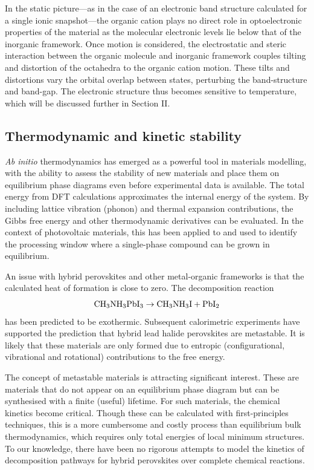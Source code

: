 In the static picture---as in the case of an electronic band structure calculated for a single ionic snapshot---the organic cation plays no direct role in optoelectronic properties of the material as the molecular electronic levels lie below that of the inorganic framework.
Once motion is considered, the electrostatic and steric interaction between the organic molecule and inorganic framework couples tilting and distortion of the octahedra to the organic cation motion.
These tilts and distortions vary the orbital overlap between states, perturbing the band-structure and band-gap.\autocite{Mosconi2014,Quarti2015a,Whalley2016,Saidi2016}
The electronic structure thus becomes sensitive to temperature, which will be discussed further in Section II.

\subsection{Thermodynamic and kinetic stability}

\textit{Ab initio} thermodynamics has emerged as a powerful tool in materials modelling, with the ability to assess the stability of new materials and place them on equilibrium phase diagrams even before experimental data is available. \autocite{Reuter2003,Kim2012,Jackson2015a}
The total energy from DFT calculations approximates the internal energy of the system. 
By including lattice vibration (phonon) and thermal expansion contributions, the Gibbs free energy 
and other thermodynamic derivatives can be evaluated.\autocite{Stoffel2010}
In the context of photovoltaic materials, this has been applied to  
and used to identify the processing window where a single-phase compound can be grown in equilibrium.\autocite{Jackson2014}

An issue with hybrid perovskites and other metal-organic frameworks is that the calculated heat of formation is close to zero.
The decomposition reaction 
\begin{equation}
\ce{CH3NH3PbI3} \rightarrow \ce{CH3NH3I} + \ce{PbI2}
\end{equation}
has been predicted to be exothermic.\autocite{Zhang2015k}
%
Subsequent calorimetric experiments have supported the prediction that hybrid lead halide perovskites are metastable.\autocite{Nagabhushana2016}
%
It is likely that these materials are only formed due to entropic (configurational, vibrational and rotational) contributions
to the free energy.

The concept of metastable materials is attracting significant interest.\autocite{Caskey2014,Walsh2015b,sun2016thermodynamic,Skelton2017} 
These are materials that do not appear on an equilibrium phase diagram but can be synthesised with a finite (useful) lifetime.
For such materials, the chemical kinetics become critical.
Though these can be calculated with first-principles techniques, this is a more cumbersome and costly process than equilibrium bulk thermodynamics, which requires only total energies of local minimum structures. 
To our knowledge, there have been no rigorous attempts to model the kinetics of decomposition pathways for hybrid perovskites over complete chemical reactions. 

